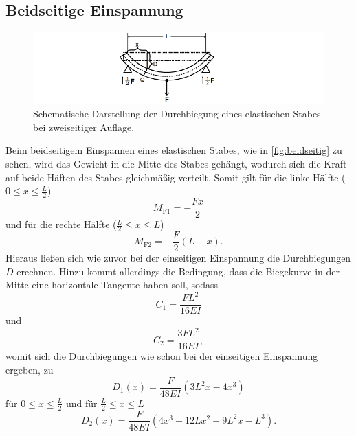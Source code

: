     \subsection{Beidseitige Einspannung}
        \begin{figure}
            \centering
            \includegraphics{content/beidseitig.png}
            \caption{Schematische Darstellung der Durchbiegung eines elastischen Stabes bei zweiseitiger Auflage. \cite[110]{V103}}
            \label{fig:beidseitig}
        \end{figure}
        Beim beidseitigem Einspannen eines elastischen Stabes, wie in \autoref{fig:beidseitig} zu sehen, wird das Gewicht in die Mitte des Stabes gehängt,
        wodurch sich die Kraft auf beide Häften des Stabes gleichmäßig verteilt.
        Somit gilt für die linke Hälfte ($0 \leq x \leq \frac{L}{2}$)
        \begin{equation}
        \label{eqn:mf1}
            M_\text{F1} = - \frac{F x } {2}
        \end{equation}
        und für die rechte Hälfte ($\frac{L}{2} \leq x \leq L $)    
        \begin{equation}
        \label{eqn:mf2}
            M_\text{F2} = - \frac {F}{2} (L - x).
        \end{equation}    
        Hieraus ließen sich wie zuvor bei der einseitigen Einspannung die Durchbiegungen $D$ erechnen.
        Hinzu kommt allerdings die Bedingung, dass die Biegekurve in der Mitte eine horizontale Tangente haben soll, sodass
        \begin{equation}
        \label{eqn:c1}
            C_1 = \frac{ F L^2} {16 E I}
        \end{equation}
        und 
        \begin{equation}
        \label{eqn:c2}
            C_2 = \frac{3 F L^2}{16 E I},
        \end{equation}
        womit sich die Durchbiegungen wie schon bei der einseitigen Einspannung ergeben, zu
        \begin{equation}
        \label{eqn:Durchbiegungbeidseitig1}
             D_1(x) =  \frac{F} {48 E I} (3L^2 x - 4 x^3)  
        \end{equation}
        für $0 \leq x \leq \frac{L}{2}$
        und für $\frac{L}{2} \leq x \leq L$
        \begin{equation}
        \label{eqn:Durchbiegungbeidseitig2}
           D_2(x) = \frac{F} {48 E I} (4 x^3 - 12 L x^2 + 9 L^2 x - L^3).
        \end{equation}   
